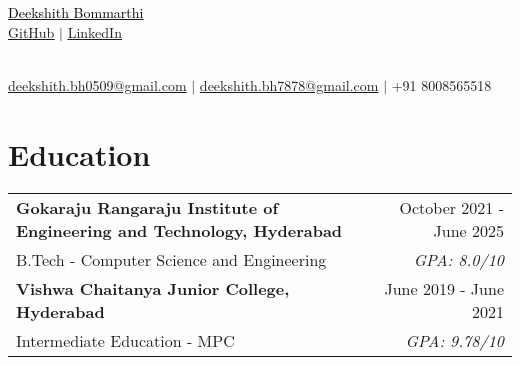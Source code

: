 \documentclass[a4paper,10pt]{article}
\newcommand{\sectionheader}[2]{%
    \begin{center}
        \textcolor{myblue}{\Huge #1} \\[6pt]
        \textcolor{mydarkblue}{\underline{\href{#2}{\raisebox{-0.05\height}{\faGithub} GitHub}} $|$}
        \textcolor{mydarkblue}{\underline{\href{https://www.linkedin.com/in/deekshith-bommarthi/}{\raisebox{-0.05\height}{\faLinkedin} LinkedIn}}}
    \end{center}
}
\newcommand{\sectionheader}[2]{%
    \begin{center}
        \vspace*{-\baselineskip} %
        \textcolor{myblue}{\Huge #1} \\[6pt]
        \vspace{-8pt} %
        \textcolor{mydarkblue}{\underline{\href{#2}{\raisebox{-0.05\height}{\faGithub} GitHub}} $|$}
        \textcolor{mydarkblue}{\underline{\href{https://www.linkedin.com/in/deekshith-bommarthi/}{\raisebox{-0.05\height}{\faLinkedin} LinkedIn}}}
    \end{center}
}
\begin{document}
\begin{center}
    \parbox{\linewidth}{%
        \centering
        \sectionheader{\href{https://deekshith0509.github.io/Portfolio.html}{\textcolor{black}{Deekshith Bommarthi}}}{https://github.com/deekshith0509/} \\[2pt]
        \textcolor{mydarkblue}{\raisebox{-0.05\height}{\faEnvelope} \href{mailto:deekshith.bh0509@gmail.com}{deekshith.bh0509@gmail.com}} $|$ 
        \textcolor{mydarkblue}{\href{mailto:deekshith.bh7878@gmail.com}{deekshith.bh7878@gmail.com}} $|$ 
        \textcolor{mydarkblue}{\raisebox{-0.05\height}{\faMobile} +91 8008565518} \\
    }
\end{center}






\section*{Education}


\begin{tabularx}{\linewidth}{@{} l r @{}}
    \color{myblue} \textbf{Gokaraju Rangaraju Institute of Engineering and Technology, Hyderabad} & \hspace{1.3cm}  \color{mydarkblue} October 2021 - June 2025 \\[1pt] %
    \color{mydarkblue} B.Tech - Computer Science and Engineering &  \vspace{-10pt}\color{mylightpurple} \textit{GPA: 8.0/10} \\[10pt] %
    \color{myblue} \vspace{0pt}\textbf{Vishwa Chaitanya Junior College, Hyderabad} & \color{mydarkblue} June 2019 - June 2021 \\[1pt] %
    \color{mydarkblue} Intermediate Education - MPC & \color{mylightpurple} \textit{GPA: 9.78/10} \\
\end{tabularx}


\newcommand{\skillsentry}[2]{%
    \textcolor{myblue}{\textbf{#1}} & \textcolor{mydarkblue}{#2} \\
}
\newcommand{\skillsentry}[2]{%
    \textcolor{myblue}{\textbf{#1}} & \textcolor{mydarkblue}{#2} \\
}
\vspace{-14pt}
\end{document}

